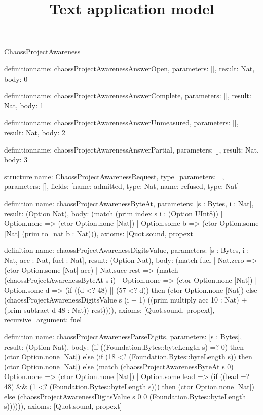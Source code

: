 \begin{lexlean}{ChaossProjectAwareness}
\title{Text application model}
\begin{semanticmodule}
definition{name: chaossProjectAwarenessAnswerOpen, parameters: [], result: Nat, body: 0}

definition{name: chaossProjectAwarenessAnswerComplete, parameters: [], result: Nat, body: 1}

definition{name: chaossProjectAwarenessAnswerUnmeasured, parameters: [], result: Nat, body: 2}

definition{name: chaossProjectAwarenessAnswerPartial, parameters: [], result: Nat, body: 3}

structure{
  name: ChaossProjectAwarenessRequest,
  type_parameters: [],
  parameters: [],
  fields: [{name: admitted, type: Nat}, {name: refused, type: Nat}]
}

definition{
  name: chaossProjectAwarenessByteAt,
  parameters: [s : Bytes, i : Nat],
  result: (Option Nat),
  body: (match (prim index s i : (Option UInt8))
    | Option.none => (ctor Option.none [Nat])
    | Option.some b => (ctor Option.some [Nat] (prim to_nat b : Nat))),
  axioms: [Quot.sound, propext]
}

definition{
  name: chaossProjectAwarenessDigitsValue,
  parameters: [s : Bytes, i : Nat, acc : Nat, fuel : Nat],
  result: (Option Nat),
  body: (match fuel
    | Nat.zero => (ctor Option.some [Nat] acc)
    | Nat.succ rest => (match (chaossProjectAwarenessByteAt s i)
      | Option.none => (ctor Option.none [Nat])
      | Option.some d => (if ((d <? 48) || (57 <? d)) then (ctor Option.none [Nat]) else (chaossProjectAwarenessDigitsValue s (i + 1) ((prim multiply acc 10 : Nat) + (prim subtract d 48 : Nat)) rest)))),
  axioms: [Quot.sound, propext],
  recursive_argument: fuel
}

definition{
  name: chaossProjectAwarenessParseDigits,
  parameters: [s : Bytes],
  result: (Option Nat),
  body: (if ((Foundation.Bytes::byteLength s) =? 0) then (ctor Option.none [Nat]) else (if (18 <? (Foundation.Bytes::byteLength s)) then (ctor Option.none [Nat]) else (match (chaossProjectAwarenessByteAt s 0)
    | Option.none => (ctor Option.none [Nat])
    | Option.some lead => (if ((lead =? 48) && (1 <? (Foundation.Bytes::byteLength s))) then (ctor Option.none [Nat]) else (chaossProjectAwarenessDigitsValue s 0 0 (Foundation.Bytes::byteLength s)))))),
  axioms: [Quot.sound, propext]
}


\end{semanticmodule}
\end{lexlean}
